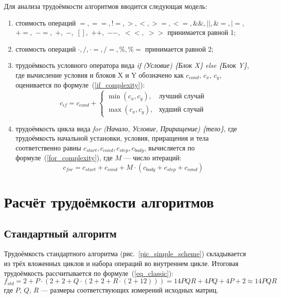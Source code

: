 Для анализа трудоёмкости алгоритмов вводится следующая модель:
\begin{enumerate}
	\item стоимость операций $=, ==, !=, >, <, >=, <=, \&\&, ||, \&=, |=,$ $+=,$ $-=,$ $+,$ $-,$ $[],$ $ ++,$ $--,$ $<<,$ $>>$ принимается равной 1;
	\item стоимость операций $\cdot, /, \cdot=, /=, \%, \%=$ принимается равной 2;
	\item трудоёмкость условного оператора вида \textit{if (Условие) \{Блок X\} else \{Блок Y\}}, где вычисление условия и блоков X и Y обозначено как $c_{cond}$, $c_x$, $c_y$, оценивается по формуле~(\ref{if_complexity}):
	\begin{equation}
		\label{if_complexity}
		c_{if} = c_{cond} + 
		\begin{cases}
			\min(c_x, c_y), & \text{лучший случай} \\
			\max(c_x, c_y), & \text{худший случай}
		\end{cases}
	\end{equation}
	\item трудоёмкость цикла вида \textit{for (Начало, Условие, Приращение) \{тело\}}, где трудоёмкость начальной установки, условия, приращения и тела соответственно равны $c_{start}, c_{cond}, c_{step}, c_{body}$, вычисляется по формуле~(\ref{for_complexity}), где $M$ --- число итераций:
	\begin{equation}
		\label{for_complexity}
		c_{for} = c_{start} + c_{cond} + M \cdot (c_{body} + c_{step} + c_{cond})
	\end{equation}
\end{enumerate}

\section{Расчёт трудоёмкости алгоритмов}

\subsection{Стандартный алгоритм}

Трудоёмкость стандартного алгоритма (рис.~\ref{pic_simple_scheme}) складывается из трёх вложенных циклов и набора операций во внутреннем цикле. Итоговая трудоёмкость рассчитывается по формуле~(\ref{eq_classic}):
\begin{equation}
	\label{eq_classic}
	f_{std} = 2 + P \cdot (2 + 2 + Q \cdot (2 + 2 + R \cdot (2 + 12))) = 14 P Q R + 4 P Q + 4 P + 2 \approx 14 P Q R
\end{equation}
где $P$, $Q$, $R$ — размеры соответствующих измерений исходных матриц.


